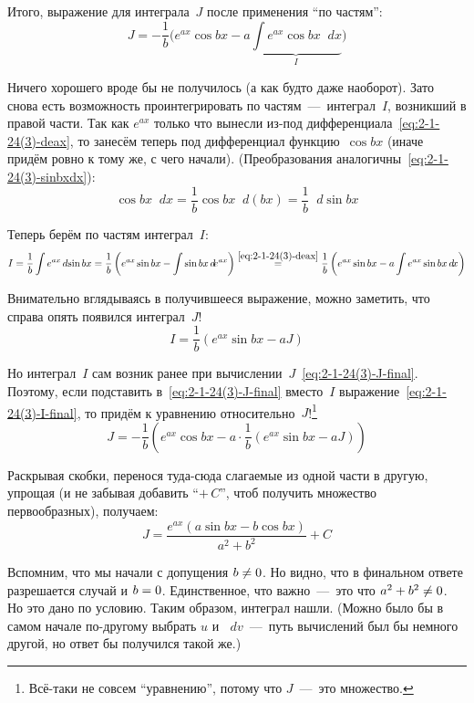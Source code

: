 \documentclass[a4paper,12pt]{article}
\newcommand{\diff}{\mathop{}\!d\!}
\begin{document}
\begin{solution}
    Итого, выражение для интеграла~$J$ после применения ``по частям'':
    \begin{equation}\label{eq:2-1-24(3)-J-final}
      J = -\frac{1}{b} \Biggl(e^{ax} \cos{bx} - a \underbrace{\int e^{ax} \cos{bx} \diff x}_{I}\Biggr)
    \end{equation}
    
    Ничего хорошего вроде бы не получилось (а как будто даже наоборот).
    Зато снова есть возможность проинтегрировать по частям~---~интеграл~$I$, возникший в правой части.
    Так как $e^{ax}$ только что вынесли из-под дифференциала~\eqref{eq:2-1-24(3)-deax}, то занесём теперь под дифференциал функцию~$\cos bx$ (иначе придём ровно к тому же, с чего начали).
    (Преобразования аналогичны~\eqref{eq:2-1-24(3)-sinbxdx}):
    \[
      \cos{bx} \diff x = \frac{1}{b} \cos{bx} \diff (bx) = \frac{1}{b} \diff \sin{bx}
    \]
    
    Теперь берём по частям интеграл~$I$:
    \[
      I = \frac{1}{b} \int e^{ax} \diff \sin{bx}
        = \frac{1}{b} \left(e^{ax} \sin{bx} - \int \sin{bx} \diff e^{ax}\right)
        \overset{\eqref{eq:2-1-24(3)-deax}}{=} \frac{1}{b} \left(e^{ax} \sin{bx} - a \int e^{ax} \sin{bx} \diff x\right)
    \]
    
    Внимательно вглядываясь в получившееся выражение, можно заметить, что справа опять появился интеграл~$J$!
    \begin{equation}\label{eq:2-1-24(3)-I-final}
      I = \frac{1}{b} \left(e^{ax} \sin{bx} - a J\right)
    \end{equation}
    
    Но интеграл~$I$ сам возник ранее при вычислении~$J$~\eqref{eq:2-1-24(3)-J-final}.
    Поэтому, если подставить в~\eqref{eq:2-1-24(3)-J-final} вместо~$I$ выражение~\eqref{eq:2-1-24(3)-I-final}, то придём к уравнению относительно~$J$!\footnote{Всё-таки не совсем ``уравнению'', потому что $J$~---~это множество.}
    \[
      J = -\frac{1}{b} \left(e^{ax} \cos{bx} - a \cdot \frac{1}{b} \left(e^{ax} \sin{bx} - a J\right)\right) 
    \]
    
    Раскрывая скобки, перенося туда-сюда слагаемые из одной части в другую, упрощая (и не забывая добавить ``$+\, C$'', чтоб получить множество первообразных), получаем:
    \[
      J = \frac{e^{ax} (a \sin{bx} - b \cos{bx})}{a^2 + b^2} + C
    \]
    
    Вспомним, что мы начали с допущения $b \hm{\not=} 0$.
    Но видно, что в финальном ответе разрешается случай и $b \hm= 0$.
    Единственное, что важно~---~это что $a^2 \hm+ b^2 \hm{\not=} 0$.
    Но это дано по условию.
    Таким образом, интеграл нашли.
    (Можно было бы в самом начале по-другому выбрать $u$ и $\diff v$~---~путь вычислений был бы немного другой, но ответ бы получился такой же.)
  \end{solution}
  
  
\end{document}
